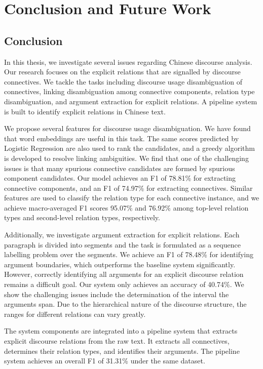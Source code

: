 %
%
%
\chapter{Conclusion and Future Work}
\label{c:future}

\section{Conclusion}

In this thesis, we investigate several issues
regarding Chinese discourse analysis. Our
research focuses on the explicit relations that
are signalled by discourse connectives.
We tackle the tasks including discourse
usage disambiguation of connectives,
linking disambiguation among connective components,
relation type disambiguation, and argument
extraction for explicit relations. A pipeline
system is built to identify explicit relations
in Chinese text.

We propose several features
for discourse usage disambiguation.
We have found that word embeddings are useful in this
task. The same scores predicted by Logistic Regression
are also used to rank the candidates, and 
a greedy algorithm is developed to resolve linking
ambiguities. We find that one of the challenging issues
is that many spurious connective candidates are formed by 
spurious component candidates. Our model achieves
an F1 of 78.81\% for extracting connective components,
and an F1 of 74.97\% for extracting connectives. Similar
features are used to classify the relation type for each
connective instance, and we achieve macro-averaged F1 scores
95.07\% and 76.92\% among top-level relation types and
second-level relation types, respectively.

Additionally, we investigate argument extraction for
explicit relations. Each paragraph is divided into segments
and the task is formulated as a sequence labelling problem
over the segments.
We achieve an F1 of 78.48\% for identifying
argument boundaries, which outperforms the baseline system
significantly. However, correctly identifying all arguments
for an explicit discourse relation remains a difficult goal. Our
system only achieves an accuracy of 40.74\%. We show
the challenging issues include the determination of
the interval the arguments span. Due to the hierarchical
nature of the discourse structure, the ranges for
different relations can vary greatly.

The system components are integrated into a pipeline
system that extracts explicit discourse relations from the raw text.
It extracts all connectives, determines their relation types,
and identifies their arguments.
The pipeline system achieves an overall F1 of 31.31\% under
the same dataset.

